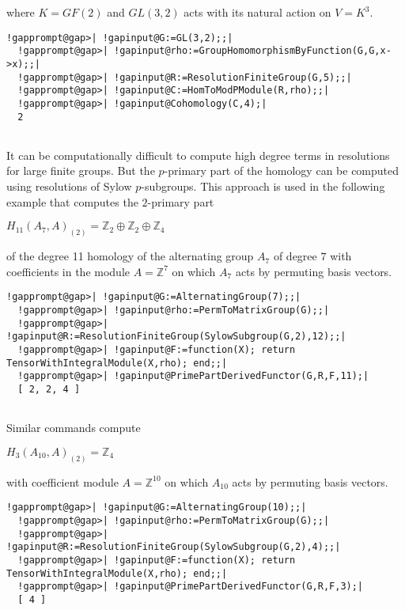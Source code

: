 \documentclass[a4paper,11pt]{report}
\begin{document}
{{where $K=GF(2)$ and $GL(3,2)$ acts with its natural action on $V=K^3$. 
\begin{Verbatim}[commandchars=!@|,fontsize=\small,frame=single,label=Example]
  !gapprompt@gap>| !gapinput@G:=GL(3,2);;|
  !gapprompt@gap>| !gapinput@rho:=GroupHomomorphismByFunction(G,G,x->x);;|
  !gapprompt@gap>| !gapinput@R:=ResolutionFiniteGroup(G,5);;|
  !gapprompt@gap>| !gapinput@C:=HomToModPModule(R,rho);;|
  !gapprompt@gap>| !gapinput@Cohomology(C,4);|
  2
  
\end{Verbatim}
 

 It can be computationally difficult to compute high degree terms in
resolutions for large finite groups. But the $p$-primary part of the homology can be computed using resolutions of Sylow $p$-subgroups. This approach is used in the following example that computes the $2$-primary part 

$H_{11}(A_7,A)_{(2)} = \mathbb Z_2 \oplus \mathbb Z_2\oplus \mathbb Z_4$ 

of the degree 11 homology of the alternating group $A_7$ of degree $7$ with coefficients in the module $A=\mathbb Z^7$ on which $A_7$ acts by permuting basis vectors. 
\begin{Verbatim}[commandchars=!@|,fontsize=\small,frame=single,label=Example]
  !gapprompt@gap>| !gapinput@G:=AlternatingGroup(7);;|
  !gapprompt@gap>| !gapinput@rho:=PermToMatrixGroup(G);;|
  !gapprompt@gap>| !gapinput@R:=ResolutionFiniteGroup(SylowSubgroup(G,2),12);;|
  !gapprompt@gap>| !gapinput@F:=function(X); return TensorWithIntegralModule(X,rho); end;;|
  !gapprompt@gap>| !gapinput@PrimePartDerivedFunctor(G,R,F,11);|
  [ 2, 2, 4 ]
  
\end{Verbatim}
 Similar commands compute 

$H_{3}(A_{10},A)_{(2)} = \mathbb Z_4$ 

with coefficient module $A=\mathbb Z^{10}$ on which $A_{10}$ acts by permuting basis vectors. 
\begin{Verbatim}[commandchars=!@|,fontsize=\small,frame=single,label=Example]
  !gapprompt@gap>| !gapinput@G:=AlternatingGroup(10);;|
  !gapprompt@gap>| !gapinput@rho:=PermToMatrixGroup(G);;|
  !gapprompt@gap>| !gapinput@R:=ResolutionFiniteGroup(SylowSubgroup(G,2),4);;|
  !gapprompt@gap>| !gapinput@F:=function(X); return TensorWithIntegralModule(X,rho); end;;|
  !gapprompt@gap>| !gapinput@PrimePartDerivedFunctor(G,R,F,3);|
  [ 4 ]
  
\end{Verbatim}
 

}}
\end{document}
